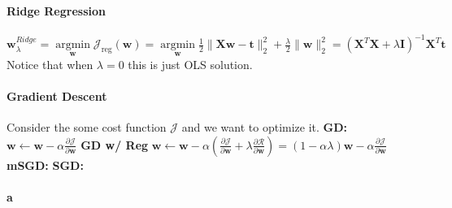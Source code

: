 \documentclass[10pt]{article}
\begin{document}
\paragraph{Ridge Regression} $\mathbf{w}_{\lambda}^{R i d g e}=\underset{\mathbf{w}}{\operatorname{argmin}} \mathcal{J}_{\mathrm{reg}}(\mathbf{w})=\underset{\mathbf{w}}{\operatorname{argmin}} \frac{1}{2}\|\mathbf{X} \mathbf{w}-\mathbf{t}\|_{2}^{2}+\frac{\lambda}{2}\|\mathbf{w}\|_{2}^{2} =\left(\mathbf{X}^{T} \mathbf{X}+\lambda \mathbf{I}\right)^{-1} \mathbf{X}^{T} \mathbf{t} $ Notice that when $\lambda = 0$ this is just OLS solution.

\paragraph{Gradient Descent} Consider the some cost function $\mathcal{J}$ and we want to optimize it. \textbf{GD:} $\mathbf{w} \leftarrow \mathbf{w}-\alpha \frac{\partial \mathcal{J}}{\partial \mathbf{w}}$ \textbf{GD w/ Reg} $\mathbf{w} \leftarrow \mathbf{w}-\alpha\left(\frac{\partial \mathcal{J}}{\partial \mathbf{w}}+\lambda \frac{\partial \mathcal{R}}{\partial \mathbf{w}}\right) =(1-\alpha \lambda) \mathbf{w}-\alpha \frac{\partial \mathcal{J}}{\partial \mathbf{w}}$ \textbf{mSGD:} \textbf{SGD:}

\paragraph{a}
\end{document}
